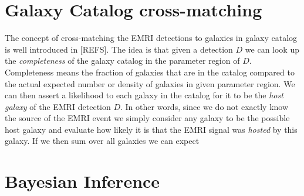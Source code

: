 \section{Galaxy Catalog cross-matching}
The concept of cross-matching the EMRI detections to galaxies in galaxy catalog is well introduced in [REFS]. The idea is that given a detection $D$ we can look up the \emph{completeness} of the galaxy catalog in the parameter region of $D$. Completeness means the fraction of galaxies that are in the catalog compared to the actual expected number or density of galaxies in given parameter region. We can then assert a likelihood to each galaxy in the catalog for it to be the \emph{host galaxy} of the EMRI detection $D$. In other words, since we do not exactly know the source of the EMRI event we simply consider any galaxy to be the possible host galaxy and evaluate how likely it is that the EMRI signal was \emph{hosted} by this galaxy. If we then sum over all galaxies we can expect




\section{Bayesian Inference}


